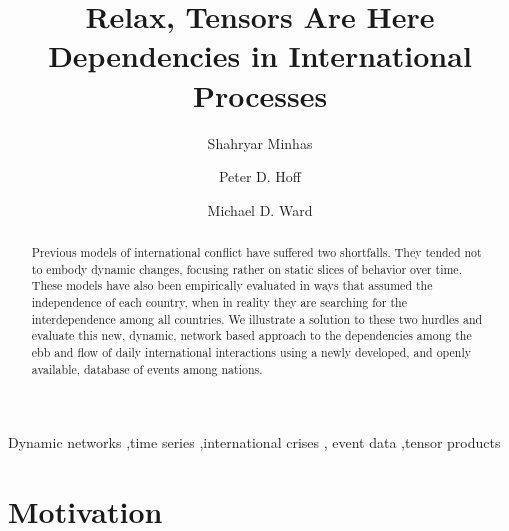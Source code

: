 \documentclass[3p,times,twocolumn,authoryear,12pt]{elsarticle}
\begin{document}
\begin{frontmatter}

\title{Relax, Tensors Are Here \\ Dependencies in International Processes}


\author[duke]{Shahryar Minhas}
\author[UW]{Peter D. Hoff}
\author[duke]{Michael D. Ward}
\address[duke]{Department of Political Science, Duke University, Durham, NC 27701, USA}
\address[UW]{Departments of Biostatistics \& Statistics, University of Washington, Seattle, WA, USA}


\begin{abstract}
Previous models of international conflict have suffered two shortfalls. They tended not to embody dynamic changes, focusing rather on static slices of behavior over time. These models have also been empirically evaluated in ways that assumed the independence of each country, when in reality they are searching for the interdependence among all countries. We illustrate a solution to these two hurdles and evaluate this new, dynamic, network based approach to the dependencies among the ebb and flow of daily international interactions using a newly developed, and openly available, database of events among nations. 

\end{abstract}

\begin{keyword}
Dynamic networks \sep time series \sep international crises \sep 
event data \sep tensor products
\end{keyword}

\end{frontmatter}

\section{Motivation}
\end{document}

